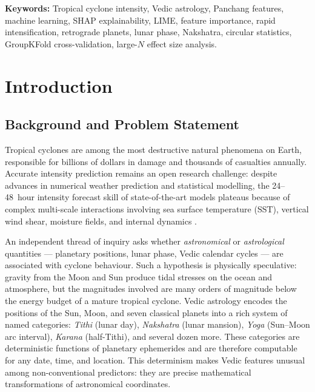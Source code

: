 \documentclass[12pt,a4paper]{article}
\begin{document}
    \noindent\textbf{Keywords:} Tropical cyclone intensity, Vedic astrology, Panchang
    features, machine learning, SHAP explainability, LIME, feature importance,
    rapid intensification, retrograde planets, lunar phase, Nakshatra, circular
    statistics, GroupKFold cross-validation, large-$N$ effect size analysis.

    \medskip
    \tableofcontents
    \newpage

    \section{Introduction}

    \subsection{Background and Problem Statement}

    Tropical cyclones are among the most destructive natural phenomena on Earth,
    responsible for billions of dollars in damage and thousands of casualties
    annually. Accurate intensity prediction remains an open research challenge:
    despite advances in numerical weather prediction and statistical modelling,
    the 24--48~hour intensity forecast skill of state-of-the-art models plateaus
    because of complex multi-scale interactions involving sea surface temperature
    (SST), vertical wind shear, moisture fields, and internal dynamics
    \cite{demaria2014advances,zhang2018tropical}.

    An independent thread of inquiry asks whether \emph{astronomical} or
    \emph{astrological} quantities --- planetary positions, lunar phase, Vedic
    calendar cycles --- are associated with cyclone behaviour. Such a hypothesis
    is physically speculative: gravity from the Moon and Sun produce tidal stresses
    on the ocean and atmosphere, but the magnitudes involved are many orders of
    magnitude below the energy budget of a mature tropical cyclone.
    Vedic astrology encodes the positions of the Sun, Moon, and seven classical
    planets into a rich system of named categories: \textit{Tithi} (lunar day),
    \textit{Nakshatra} (lunar mansion), \textit{Yoga} (Sun--Moon arc interval),
    \textit{Karana} (half-Tithi), and several dozen more. These categories are
    deterministic functions of planetary ephemerides and are therefore computable
    for any date, time, and location. This determinism makes Vedic features unusual
    among non-conventional predictors: they are precise mathematical transformations
    of astronomical coordinates.
\end{document}
